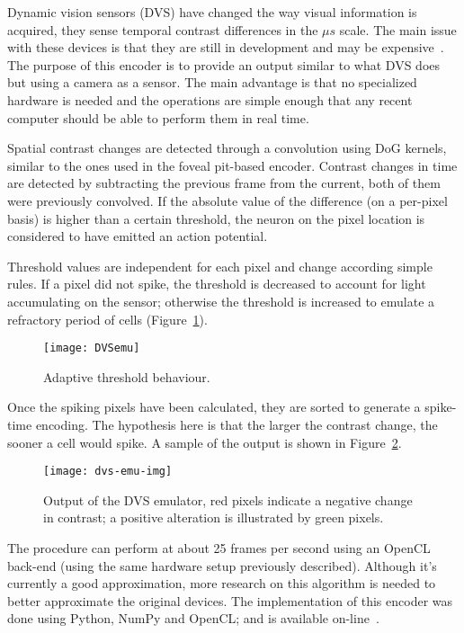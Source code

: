 Dynamic vision sensors (DVS) have changed the way visual information is acquired, they sense temporal contrast differences in the $\mu s$ scale. The main issue with these devices is that they are still in development and may be expensive~\cite{aer-retina-bernabe,dvs-zurich}. The purpose of this encoder is to provide an output similar to what DVS does but using a camera as a sensor.
The main advantage is that no specialized hardware is needed and the operations are simple enough that any recent computer should be able to perform them in real time. 

Spatial contrast changes are detected through a convolution using DoG kernels, similar to the ones used in the foveal pit-based encoder. Contrast changes in time are detected by subtracting the previous frame from the current, both of them were previously convolved. If the absolute value of the difference (on a per-pixel basis) is higher than a certain threshold, the neuron on the pixel location is considered to have emitted an action potential. 

Threshold values are independent for each pixel and change according simple rules. If a pixel did not spike, the threshold is decreased to account for light accumulating on the sensor; otherwise the threshold is increased to emulate a refractory period of cells (Figure~\ref{fig:c2s:threshold_behaviour}).

\begin{figure}[h]
  \begin{center}
    \texttt{[image: DVSemu]}
    \caption{Adaptive threshold behaviour.}
    \label{fig:c2s:threshold_behaviour}
  \end{center}
\end{figure}
\newpage
Once the spiking pixels have been calculated, they are sorted to generate a spike-time encoding. The hypothesis here is that the larger the contrast change, the sooner a cell would spike. A sample of the output is shown in Figure~\ref{fig:c2s:dvs-emu-output}.

\begin{figure}[h]
  \begin{center}
    \texttt{[image: dvs-emu-img]}
    \caption{Output of the DVS emulator, red pixels indicate a negative change in contrast; a positive alteration is illustrated by green pixels.}
    \label{fig:c2s:dvs-emu-output}
  \end{center}
\end{figure}

The procedure can perform at about 25 frames per second using an OpenCL back-end (using the same hardware setup previously described). Although 
it's currently a good approximation, more research on this algorithm is needed 
to better approximate the original devices. The implementation of this encoder was done using Python, NumPy and OpenCL; and is available on-line~\cite{pydvs-code}.

